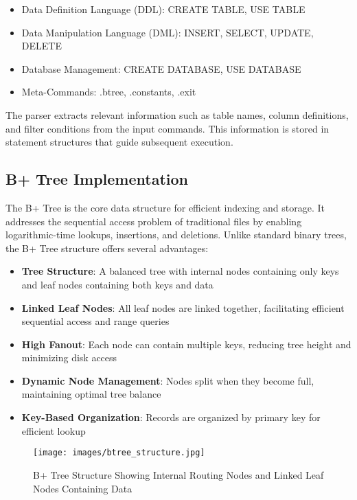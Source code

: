 \documentclass[12pt,a4paper]{article}  %
\begin{document}
\begin{itemize}
    \item Data Definition Language (DDL): CREATE TABLE, USE TABLE
    \item Data Manipulation Language (DML): INSERT, SELECT, UPDATE, DELETE
    \item Database Management: CREATE DATABASE, USE DATABASE
    \item Meta-Commands: .btree, .constants, .exit
\end{itemize}

The parser extracts relevant information such as table names, column definitions, and filter conditions from the input commands. This information is stored in statement structures that guide subsequent execution.

\subsection{B+ Tree Implementation}
The B+ Tree is the core data structure for efficient indexing and storage. It addresses the sequential access problem of traditional files by enabling logarithmic-time lookups, insertions, and deletions. Unlike standard binary trees, the B+ Tree structure offers several advantages:

\begin{itemize}
    \item \textbf{Tree Structure}: A balanced tree with internal nodes containing only keys and leaf nodes containing both keys and data
    \item \textbf{Linked Leaf Nodes}: All leaf nodes are linked together, facilitating efficient sequential access and range queries
    \item \textbf{High Fanout}: Each node can contain multiple keys, reducing tree height and minimizing disk access
    \item \textbf{Dynamic Node Management}: Nodes split when they become full, maintaining optimal tree balance
    \item \textbf{Key-Based Organization}: Records are organized by primary key for efficient lookup
\end{itemize}

\begin{figure}[H]
\centering
\texttt{[image: images/btree\_structure.jpg]}
\caption{B+ Tree Structure Showing Internal Routing Nodes and Linked Leaf Nodes Containing Data}
\label{fig:btree_structure}
\end{figure}
\end{document}
